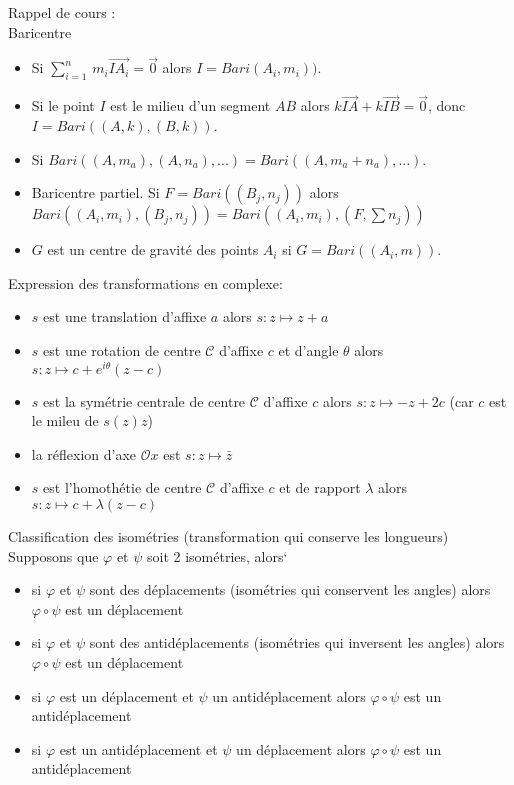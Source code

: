 \documentclass[]{book}
\theoremstyle{definition}
\begin{document}
Rappel de cours :\\
Baricentre
\begin{itemize}
\item Si $\sum_{i=1}^{n}\, m_i\overrightarrow{IA_i} = \overrightarrow{0}$ alors $I = Bari(A_i, m_i))$.
\item Si le point $I$ est le milieu d'un segment $AB$ alors $k\overrightarrow{IA}+k\overrightarrow{IB} = \overrightarrow{0}$, donc $I=Bari((A,k),(B,k))$.
\item Si $Bari((A,m_a), (A,n_a), ...) = Bari((A,m_a+n_a), ...)$.
\item Baricentre partiel. Si $F = Bari((B_j, n_j))$ alors $Bari((A_i,m_i),(B_j, n_j)) = Bari((A_i,m_i),(F,\sum n_j))$
\item $G$ est un centre de gravit\'e des points $A_i$ si $G=Bari((A_i, m))$.
\end{itemize}


Expression des transformations en complexe:
\begin{itemize}
\item $s$ est une translation d'affixe $a$ alors $s: z \mapsto z + a$
\item $s$ est une rotation de centre $\mathcal{C}$ d'affixe $c$ et d'angle $\theta$ alors $s: z \mapsto c + e^{i\theta}(z -c)$
\item $s$ est la sym\'etrie centrale de centre $\mathcal{C}$ d'affixe $c$ alors $s: z \mapsto -z + 2c$ (car $c$ est le mileu de $s(z)z$)
\item la r\'eflexion d'axe $\mathcal{O}x$ est $s: z \mapsto \bar{z}$ 
\item $s$ est l'homoth\'etie de centre $\mathcal{C}$ d'affixe $c$ et de rapport $\lambda$ alors $s: z \mapsto c + \lambda(z-c)$
\end{itemize}



Classification des isom\'etries (transformation qui conserve les longueurs)\\
Supposons que $\varphi$ et $\psi$ soit 2 isom\'etries, alors`
\begin{itemize}
\item si $\varphi$ et $\psi$ sont des d\'eplacements (isom\'etries qui conservent les angles) alors $\varphi \circ \psi$ est un d\'eplacement
\item si $\varphi$ et $\psi$ sont des antid\'eplacements (isom\'etries qui inversent les angles) alors $\varphi \circ \psi$ est un d\'eplacement
\item si $\varphi$ est un d\'eplacement et $\psi$ un antid\'eplacement alors $\varphi \circ \psi$ est un antid\'eplacement
\item si $\varphi$ est un antid\'eplacement et $\psi$ un d\'eplacement alors $\varphi \circ \psi$ est un antid\'eplacement
\end{itemize}
\end{document}

